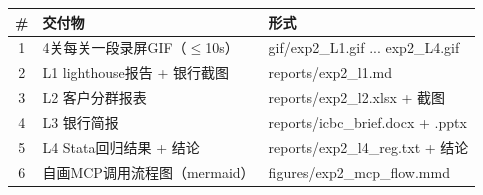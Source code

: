 
\begin{table}[H]
\centering
\begin{tabular}{cll}
\toprule
\textbf{\#} & \textbf{交付物} & \textbf{形式} \\
\midrule
1 & 4关每关一段录屏GIF（$\leq$10s） & gif/exp2\_L1.gif ... exp2\_L4.gif \\
2 & L1 lighthouse报告 + 银行截图 & reports/exp2\_l1.md \\
3 & L2 客户分群报表 & reports/exp2\_l2.xlsx + 截图 \\
4 & L3 银行简报 & reports/icbc\_brief.docx + .pptx \\
5 & L4 Stata回归结果 + 结论 & reports/exp2\_l4\_reg.txt + 结论 \\
6 & 自画MCP调用流程图（mermaid） & figures/exp2\_mcp\_flow.mmd \\
\bottomrule
\end{tabular}
\end{table}
